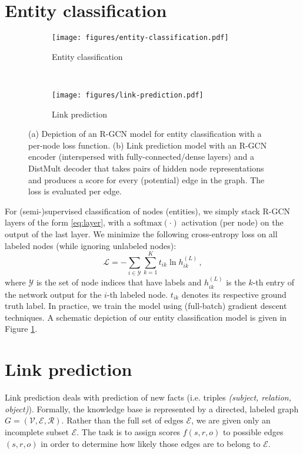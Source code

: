 \documentclass[letterpaper]{article} \usepackage{aaai18}  \usepackage{times}  \usepackage{helvet}  \usepackage{courier}  \usepackage{url}  \usepackage{graphicx}  \frenchspacing
\begin{document}
\section{Entity classification}
\begin{figure}[t!]
    \centering
    \begin{subfigure}[b]{0.4\linewidth}
      \centering
      \texttt{[image: figures/entity-classification.pdf]}
      \caption{Entity classification}        
      \label{fig:model-b}
    \end{subfigure}~\quad
    \begin{subfigure}[b]{0.49\linewidth}
        \centering
        \texttt{[image: figures/link-prediction.pdf]}
        \caption{Link prediction}
        \label{fig:model-c}
    \end{subfigure}
    \caption{(a) Depiction of an R-GCN model for entity classification with a per-node loss function. (b) Link prediction model with an R-GCN encoder (interspersed with fully-connected/dense layers) and a DistMult decoder that takes pairs of hidden node representations and produces a score for every (potential) edge in the graph. The loss is evaluated per edge.}
\end{figure}

For (semi-)supervised classification of nodes (entities), we simply stack R-GCN layers of the form \eqref{eq:layer}, with a $\mathrm{softmax}(\cdot)$ activation (per node) on the output of the last layer. We minimize the following cross-entropy loss on all labeled nodes (while ignoring unlabeled nodes):
\begin{equation}
\mathcal{L}= -\sum_{i\in\mathcal{Y}}\sum_{k=1}^K t_{ik} \ln h_{ik}^{(L)}  \, ,
\label{eq:}
\end{equation} 
where $\mathcal{Y}$ is the set of node indices that have labels and $h_{ik}^{(L)}$ is the $k$-th entry of the network output for the $i$-th labeled node. $t_{ik}$ denotes its respective ground truth label. In practice, we train the model using (full-batch) gradient descent techniques. A schematic depiction of our entity classification model is given in Figure \ref{fig:model-b}. 
\section{Link prediction}\label{section:link_prediction}
Link prediction deals with prediction of new facts (i.e. triples \textit{(subject, relation, object)}). Formally, the knowledge base is represented by a directed, labeled graph $G = (\mathcal{V},\mathcal{E},\mathcal{R})$. Rather than the full set of edges $\mathcal{E}$, we are given only an incomplete subset $\hat{\mathcal{E}}$. The task is to assign scores $f(s,r,o)$ to possible edges $(s,r,o)$ in order to determine how likely those edges are to belong to $\mathcal{E}$.
\end{document}
